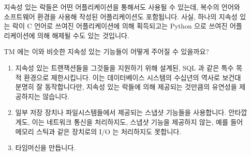 지속성 있는 락들은 어떤 어플리케이션을 통해서도 사용될 수 있는데, 복수의 언어와
소프트웨어 환경을 사용해 작성된 어플리케이션도 포함됩니다.
사실, 하나의 지속성 있는 락이 C 언어로 쓰여진 어플리케이션에 의해 획득되고는
Python 으로 쓰여진 어플리케이션에 의해 해제될 수도 있는 것입니다.

TM 에는 이와 비슷한 지속성 있는 기능들이 어떻게 주어질 수 있을까요?

\begin{enumerate}
\item	지속성 있는 트랜잭션들을 그것들을 지원하기 위해 설계된, SQL 과 같은
	특수 목적 환경으로 제한시킵니다.
	이는 데이터베이스 시스템의 수십년의 역사로 보건대 분명히 잘
	동작합니다만, 지속성 있는 락들에 의해 제공되는 것만큼의 유연성을
	제공하지는 않습니다.
\item	일부 저장 장치나 파일시스템들에서 제공되는 스냅샷 기능들을 사용합니다.
	안타깝게도, 이는 네트워크 통신을 처리하지도, 스냅샷 기능을 제공하지
	않는, 예를 들어 메모리 스틱과 같은 장치로의 I/O 는 처리하지도 못합니다.
\item	타임머신을 만듭니다.

\end{enumerate}


